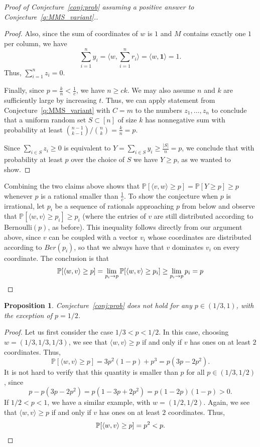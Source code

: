 \documentclass[11pt]{amsart}
\newtheorem{proposition}[theorem]{\bf Proposition}
\theoremstyle{definition}
\newenvironment{claimproof}{%
  \renewcommand{\qedsymbol}{$\boxdot$}%
  \begin{proof}%
}{%
  \end{proof}%
  \renewcommand{\qedsymbol}{$\square$}%
}
\def\Pb{\mathbb{P}}
\begin{document}
\begin{proof}[Proof of Conjecture~\ref{conj:prob} assuming a positive answer to Conjecture~\ref{q:MMS_variant}.]
\begin{claimproof}
Also, since the sum of coordinates of $w$ is $1$ and $M$ contains exactly one $1$ per column, we have \[\sum_{i=1}^n y_i=\langle w, \sum_{i=1}^n r_i\rangle=\langle w, \mathbf{1}\rangle=1.\]
Thus, $\sum_{i=1}^n z_i=0$. 

Finally, since $p=\frac{k}{n}<\frac{1}{c}$, we have $n\geq ck$. We may also assume $n$ and $k$ are sufficiently large by increasing $t$. Thus, we can apply statement from Conjecture~\ref{q:MMS_variant} with $C=m$ to the numbers $z_1, \dots, z_n$ to conclude that a uniform random set $S\subset[n]$ of size $k$ has nonnegative sum with probability at least $\binom{n-1}{k-1}/\binom{n}{k}=\frac{k}{n}=p$. 

Since $\sum_{i\in S}z_i\geq 0$ is equivalent to $Y=\sum_{i\in S} y_i\geq \frac{|S|}{n}=p$, we conclude that with probability at least $p$ over the choice of $S$ we have $Y\geq p$, as we wanted to show.
\end{claimproof}

Combining the two claims above shows that $\Pb[\langle v, w\rangle\geq p]=\Pb[Y\geq p]\geq p$ whenever $p$ is a rational smaller than $\frac{1}{c}$. To show the conjecture when $p$ is irrational, let $p_i$ be a sequence of rationals approaching $p$ from below and observe that $\Pb[\langle w, v\rangle \geq p_i]\geq p_i$ (where the entries of $v$ are still distributed according to Bernoulli$(p)$, as before). This inequality follows directly from our argument above, since $v$ can be coupled with a vector $v_i$ whose coordinates are distributed according to $Ber(p_i)$, so that we always have that $v$ dominates $v_i$ on every coordinate. The conclusion is that 
\[\Pb[\langle w, v\rangle\geq p]=\lim_{p_i\to p}\Pb[\langle w, v\rangle\geq p_i]\geq \lim_{p_i\to p}p_i=p\qedhere\]
\end{proof}

\begin{proposition}\label{prop:counterexample}
Conjecture~\ref{conj:prob} does not hold for any $p\in (1/3, 1)$, with the exception of $p=1/2$. 
\end{proposition}
\begin{proof}
Let us first consider the case $1/3<p<1/2$. In this case, choosing $w=(1/3, 1/3, 1/3)$, we see that $\langle w, v\rangle\geq p$ if and only if $v$ has ones on at least $2$ coordinates. Thus,
\[\Pb[\langle w, v\rangle\geq p]=3p^2(1-p)+p^3=p(3p-2p^2).\]
It is not hard to verify that this quantity is smaller than $p$ for all $p\in (1/3, 1/2)$, since 
\[p-p(3p-2p^2)=p(1-3p+2p^2)=p(1-2p)(1-p)>0.\]
If $1/2<p<1$, we have a similar example, with $w=(1/2, 1/2)$. Again, we see that $\langle w, v\rangle\geq p$ if and only if $v$ has ones on at least $2$ coordinates. Thus,
\[\Pb[\langle w, v\rangle\geq p]=p^2<p.\qedhere\]
\end{proof}
\end{document}
